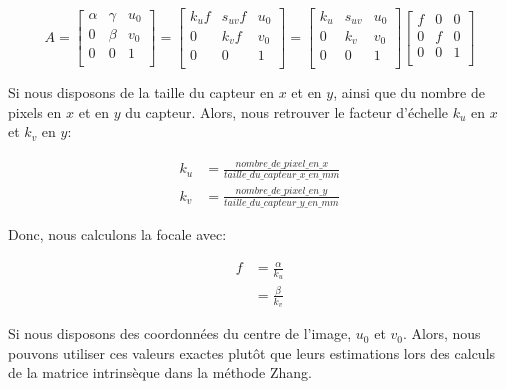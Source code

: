 \documentclass[a4paper,11pt]{article}
\begin{document}
\begin{equation}
  A=
  \begin{bmatrix}
   \alpha & \gamma & u_0 \\
   0 & \beta & v_0 \\
   0 & 0 & 1 \\
  \end{bmatrix}
  =
  \begin{bmatrix}
   k_uf & s_{uv}f & u_0 \\
   0 & k_vf & v_0 \\
   0 & 0 & 1 \\
  \end{bmatrix}
  =
  \begin{bmatrix}
   k_u & s_{uv} & u_0 \\
   0 & k_v & v_0 \\
   0 & 0 & 1 \\
  \end{bmatrix}
  \begin{bmatrix}
    f & 0 & 0 \\
    0 & f & 0 \\
    0 & 0 & 1 \\
  \end{bmatrix}
\end{equation}

Si nous disposons de la taille du capteur en $x$ et en $y$, ainsi que du nombre de 
pixels en $x$ et en $y$ du capteur. Alors, nous retrouver le facteur d'échelle $k_u$ en 
$x$ et $k_v$ en $y$:

\begin{equation}
\begin{aligned}
  k_u &= \frac{nombre\_de\_pixel\_en\_x}{taille\_du\_capteur\_x\_en\_mm} \\
  k_v &= \frac{nombre\_de\_pixel\_en\_y}{taille\_du\_capteur\_y\_en\_mm} 
\end{aligned}
\end{equation}

Donc, nous calculons la focale avec: 

\begin{equation}
\begin{aligned}
  f &= \frac{\alpha}{k_u} \\
  &= \frac{\beta}{k_v}
\end{aligned}
\end{equation}

Si nous disposons des coordonnées du centre de l'image, $u_0$ et $v_0$. Alors,
nous pouvons utiliser ces valeurs exactes plutôt que leurs estimations lors des calculs 
de la matrice intrinsèque dans la méthode Zhang.
\end{document}
